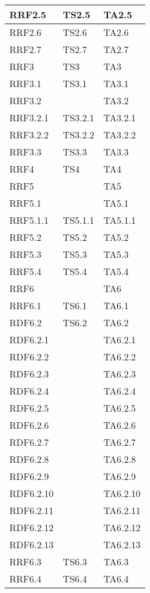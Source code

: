 \begin{longtabu}{| X | X | X |}
				RRF2.5 	&	TS2.5 	&	TA2.5 	\\ \hline
				RRF2.6 	&	TS2.6 	&	TA2.6 	\\ \hline
				RRF2.7 	&	TS2.7 	&	TA2.7 	\\ \hline
				RRF3 	&	TS3 	&	TA3 	\\ \hline
				RRF3.1 	&	TS3.1 	&	TA3.1 	\\ \hline
				RRF3.2 	&		&	TA3.2 	\\ \hline
				RRF3.2.1 	&	TS3.2.1 	&	TA3.2.1 	\\ \hline
				RRF3.2.2 	&	TS3.2.2 	&	TA3.2.2 	\\ \hline
				RRF3.3 	&	TS3.3 	&	TA3.3 	\\ \hline
				RRF4 	&	TS4 	&	TA4 	\\ \hline
				RRF5 	&		&	TA5 	\\ \hline
				RRF5.1 	&		&	TA5.1 	\\ \hline
				RRF5.1.1 	&	TS5.1.1 	&	TA5.1.1 	\\ \hline
				RRF5.2 	&	TS5.2 	&	TA5.2 	\\ \hline
				RRF5.3 	&	TS5.3 	&	TA5.3 	\\ \hline
				RRF5.4 	&	TS5.4 	&	TA5.4 	\\ \hline
				RRF6 	&		&	TA6 	\\ \hline
				RRF6.1 	&	TS6.1 	&	TA6.1 	\\ \hline
				RDF6.2 	&	TS6.2 	&	TA6.2 	\\ \hline
				RDF6.2.1 	&		&	TA6.2.1 	\\ \hline
				RDF6.2.2 	&		&	TA6.2.2 	\\ \hline
				RDF6.2.3 	&		&	TA6.2.3 	\\ \hline
				RDF6.2.4 	&		&	TA6.2.4 	\\ \hline
				RDF6.2.5 	&		&	TA6.2.5 	\\ \hline
				RDF6.2.6 	&		&	TA6.2.6 	\\ \hline
				RDF6.2.7 	&		&	TA6.2.7 	\\ \hline
				RDF6.2.8 	&		&	TA6.2.8 	\\ \hline
				RDF6.2.9 	&		&	TA6.2.9 	\\ \hline
				RDF6.2.10 	&		&	TA6.2.10 	\\ \hline
				RDF6.2.11 	&		&	TA6.2.11 	\\ \hline
				RDF6.2.12 	&		&	TA6.2.12 	\\ \hline
				RDF6.2.13 	&		&	TA6.2.13 	\\ \hline
				RRF6.3 	&	TS6.3 	&	TA6.3 	\\ \hline
				RRF6.4 	&	TS6.4 	&	TA6.4 	\\ \hline

\end{longtabu}
